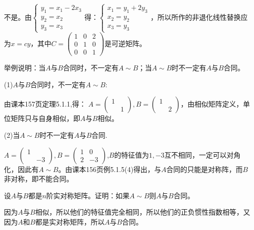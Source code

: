 \documentclass[a4paper]{report}
\begin{document}
\begin{jie}
不是。由$
\begin{cases}
y_1=x_1-2x_3\\
y_2=x_2\\
y_3=x_3
\end{cases}
$得：$
\begin{cases}
x_1=y_1+2y_3\\x_2=y_2\\x_3=y_3
\end{cases}$，所以所作的非退化线性替换应为$x=cy$，其中$C=
\begin{pmatrix}
1&0&2\\0&1&0\\0&0&1
\end{pmatrix}
$是可逆矩阵。
\end{jie}

\EX 举例说明：当$A$与$B$合同时，不一定有$A\sim B$；当$A\sim B$时不一定有$A$与$B$合同。

\begin{jie}
(1)$A$与$B$合同时，不一定有$A\sim B$:

由课本157页定理5.1.1,得：
$
A=\begin{pmatrix}
   1\\&1
  \end{pmatrix},B=\begin{pmatrix}
                   1\\&2
                  \end{pmatrix}
$，由相似矩阵定义，单位矩阵只与自身相似，即$A$与$B$相似。

(2)当$A\sim B$时不一定有$A$与$B$合同.

$
A=\begin{pmatrix}
   1\\&-3
  \end{pmatrix},B=\begin{pmatrix}
   1&0\\2&-3
  \end{pmatrix}
$,$B$的特征值为$1,-3$互不相同，一定可以对角化，因此有$A\sim B$。由课本156页例5.1.5(4)得出，与$A$合同的只能是对称阵，而$B$非对称，即不能合同。
\end{jie}

\EX 设$A$与$B$都是$n$阶实对称矩阵。证明：如果$A\sim B$则$A$与$B$合同。

\begin{zhengming}
因为$A$与$B$相似，所以他们的特征值完全相同，所以他们的正负惯性指数相等，又因为$A$和$B$都是实对称矩阵，所以$A$与$B$合同。
\end{zhengming}
\end{document}
